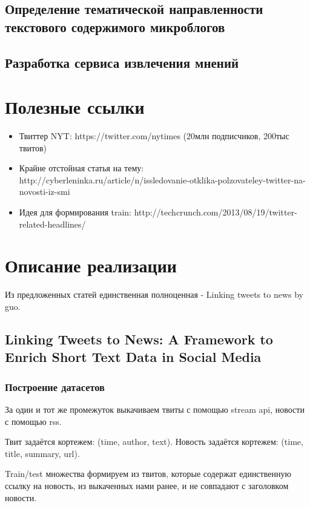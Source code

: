 \documentclass[14pt,a4paper,oneside]{extarticle}
\begin{document}
    \subsection{Определение тематической направленности текстового содержимого микроблогов}
    \subsection{Разработка сервиса извлечения мнений}
    

\section{Полезные ссылки}
    \begin{itemize}
        \item Твиттер NYT: https://twitter.com/nytimes (20млн подписчиков, 200тыс твитов)
        \item Крайне отстойная статья на тему: http://cyberleninka.ru/article/n/issledovanie-otklika-polzovateley-twitter-na-novosti-iz-smi
        \item Идея для формирования train: http://techcrunch.com/2013/08/19/twitter-related-headlines/
    \end{itemize}
\clearpage

\section{Описание реализации}
    Из предложенных статей единственная полноценная - Linking tweets to news by guo.

    \subsection{Linking Tweets to News: A Framework to Enrich Short Text Data in Social Media}
        \subsubsection{Построение датасетов}
            За один и тот же промежуток выкачиваем твиты с помощью stream api, новости с помощью rss.

            Твит задаётся кортежем: (time, author, text). Новость задаётся кортежем: (time, title, summary, url).

            Train/test множества формируем из твитов, которые содержат единственную ссылку на новость, из выкаченных нами ранее, и не совпадают с заголовком новости.
\end{document}
